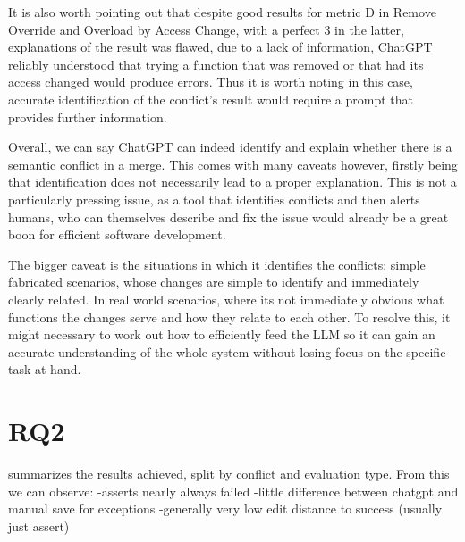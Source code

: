 It is also worth pointing out that despite good results for metric D in Remove Override and Overload by Access Change, with a perfect 3 in the latter, explanations of the result was flawed, due to a lack of information, ChatGPT reliably understood that trying a function that was removed or that had its access changed would produce errors. Thus it is worth noting in this case, accurate identification of the conflict's result would require a prompt that provides further information.

Overall, we can say ChatGPT can indeed identify and explain whether there is a semantic conflict in a merge. This comes with many caveats however, firstly being that identification does not necessarily lead to a proper explanation. This is not a particularly pressing issue, as a tool that identifies conflicts and then alerts humans, who can themselves describe and fix the issue would already be a great boon for efficient software development.

The bigger caveat is the situations in which it identifies the conflicts: simple fabricated scenarios, whose changes are simple to identify and immediately clearly related. In real world scenarios, where its not immediately obvious what functions the changes serve and how they relate to each other. To resolve this, it might necessary to work out how to efficiently feed the LLM so it can gain an accurate understanding of the whole system without losing focus on the specific task at hand.

\section{RQ2}\label{sec:results:rq2}

 summarizes the results achieved, split by conflict and evaluation type.
From this we can observe:
-asserts nearly always failed
-little difference between chatgpt and manual save for exceptions
-generally very low edit distance to success (usually just assert)

